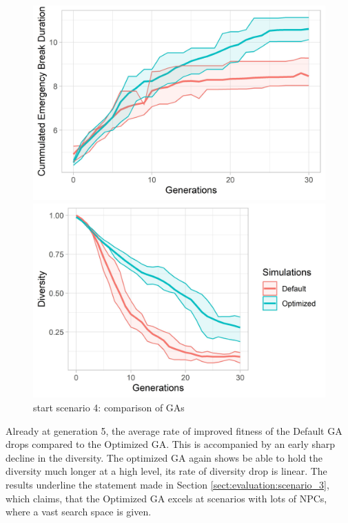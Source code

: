 \begin{figure}[ht] 
	\begin{minipage}[b]{0.5\linewidth}
		\centering
		\includegraphics[width=1\linewidth]{simulations/evaluation/plots/sim_4_ga_generations} 
	\end{minipage}%
	\begin{minipage}[b]{0.5\linewidth}
		\centering
		\includegraphics[width=1\linewidth]{simulations/evaluation/plots/sim_4_ga_diversity} 
	\end{minipage} 
	\caption{start scenario 4: comparison of GAs}
	\label{fig:evaluation:sim_4_ga_comparison}
\end{figure}

Already at generation 5, the average rate of improved fitness of the Default GA drops compared to the Optimized GA. This is accompanied by an early sharp decline in the diversity. The optimized GA again shows be able to hold the diversity much longer at a high level, its rate of diversity drop is linear.
The results underline the statement made in Section \ref{sect:evaluation:scenario_3}, which claims, that the Optimized GA excels at scenarios with lots of NPCs, where a vast search space is given.



